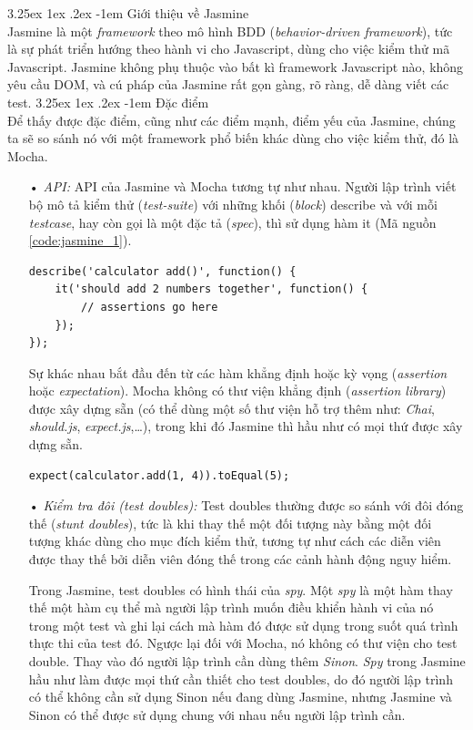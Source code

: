 \documentclass[12pt,a4paper]{article}
\makeatletter
\newcommand{\myparagraph}[1]{\paragraph{#1}\mbox{}\\} %
\renewcommand\paragraph{\@startsection{paragraph}{5}{\z@}%
  {3.25ex \@plus1ex \@minus.2ex}%
  {-1em}%
  {\normalfont\normalsize\bfseries}}
\makeatother
\begin{document}
\myparagraph{Giới thiệu về Jasmine}
Jasmine là một \textit{framework} theo mô hình BDD (\textit{behavior-driven framework}), tức là sự phát triển hướng theo hành vi cho Javascript, dùng cho việc kiểm thử mã Javascript. Jasmine không phụ thuộc vào bất kì framework Javascript nào, không yêu cầu DOM, và cú pháp của Jasmine rất gọn gàng, rõ ràng, dễ dàng viết các test.
\myparagraph{Đặc điểm}
Để thấy được đặc điểm, cũng như các điểm mạnh, điểm yếu của Jasmine, chúng ta sẽ so sánh\cite{mocha_vs_jasmine} nó với một framework phổ biến khác dùng cho việc kiểm thử, đó là Mocha.
\begin{itemize}
\item[•] \emph{API:} 
API của Jasmine và Mocha tương tự như nhau. Người lập trình viết bộ mô tả kiểm thử (\textit{test-suite}) với những khối (\textit{block}) \textsf{describe} và với mỗi \textit{testcase}, hay còn gọi là một đặc tả (\textit{spec}), thì sử dụng hàm \textsf{it} (Mã nguồn \ref{code:jasmine_1}).

\begin{lstlisting}[caption=Cấu trúc của một test-suite trong Jasmine,label={code:jasmine_1}]
describe('calculator add()', function() {
	it('should add 2 numbers together', function() {
		// assertions go here
	});
});
\end{lstlisting}

Sự khác nhau bắt đầu đến từ các hàm khẳng định hoặc kỳ vọng (\textit{assertion} hoặc \textit{expectation}). Mocha không có thư viện khẳng định (\textit{assertion library}) được xây dựng sẵn (có thể dùng một số thư viện hỗ trợ thêm như: \textit{Chai}, \textit{should.js}, \textit{expect.js},…), trong khi đó Jasmine thì hầu như có mọi thứ được xây dựng sẵn.

\begin{lstlisting}[caption=Ví dụ sử dụng \textsf{expect} trong Jasmine,label={code:jasmine_2}]
expect(calculator.add(1, 4)).toEqual(5);
\end{lstlisting}

\item[•] \emph{Kiểm tra đôi (test doubles):}
Test doubles thường được so sánh với đôi đóng thế (\textit{stunt doubles}), tức là khi thay thế một đối tượng này bằng một đối tượng khác dùng cho mục đích kiểm thử, tương tự như cách các diễn viên được thay thế bởi diễn viên đóng thế trong các cảnh hành động nguy hiểm.

Trong Jasmine, test doubles có hình thái của \textit{spy}. Một \textit{spy} là một hàm thay thế một hàm cụ thể mà người lập trình muốn điều khiển hành vi của nó trong một test và ghi lại cách mà hàm đó được sử dụng trong suốt quá trình thực thi của test đó.
Ngược lại đối với Mocha, nó không có thư viện cho test double. Thay vào đó người lập trình cần dùng thêm \textit{Sinon}. \textit{Spy} trong Jasmine hầu như làm được mọi thứ cần thiết cho test doubles, do đó người lập trình có thể không cần sử dụng Sinon nếu đang dùng Jasmine, nhưng Jasmine và Sinon có thể được sử dụng chung với nhau nếu người lập trình cần.


\end{itemize}
\end{document}
